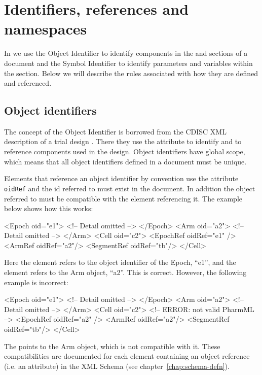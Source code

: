 \section{Identifiers, references and namespaces}

In \pharmml we use the Object Identifier to identify components in the
 and  sections of a \pharmml document and
the Symbol Identifier to identify parameters and variables within the
 section. Below we will describe the rules associated
with how they are defined and referenced.


\subsection{Object identifiers}

The concept of the Object Identifier is borrowed from the CDISC XML
description of a trial design \cite{CDISC:2011a}. There they use the
attribute  to identify and to reference components used in
the design. Object identifiers have global scope, which means that all
object identifiers defined in a \pharmml document must be unique.

Elements that reference an object identifier by convention use the
attribute \texttt{oidRef} and the id referred to must exist in the
\pharmml document. In addition the object referred to must be
compatible with the element referencing it. The example below shows
how this works:
%
\begin{xmlcode}
<Epoch oid="e1">
  <!-- Detail omitted -->
</Epoch>
<Arm oid="a2">
  <!-- Detail omitted -->
</Arm>
<Cell oid="c2">
    <EpochRef oidRef="e1" />
    <ArmRef oidRef="a2"/>
    <SegmentRef oidRef="tb"/>
</Cell>
\end{xmlcode}
%
Here the element  refers to the object identifier of
the Epoch, ``e1'', and the  element refers to the Arm
object, ``a2''. This is correct. However, the following example
is incorrect:
%
\begin{xmlcode}
<Epoch oid="e1">
  <!-- Detail omitted -->
</Epoch>
<Arm oid="a2">
  <!-- Detail omitted -->
</Arm>
<Cell oid="c2">
    <!-- ERROR: not valid PharmML -->
    <EpochRef oidRef="a2" />
    <ArmRef oidRef="a2"/>
    <SegmentRef oidRef="tb"/>
</Cell>
\end{xmlcode}
%
The  points to the Arm object, which is not compatible
with it. These compatibilities are documented for each element
containing an object reference (i.e.\xspace an 
attribute) in the XML Schema (see chapter~\ref{chap:schema-defn}).


